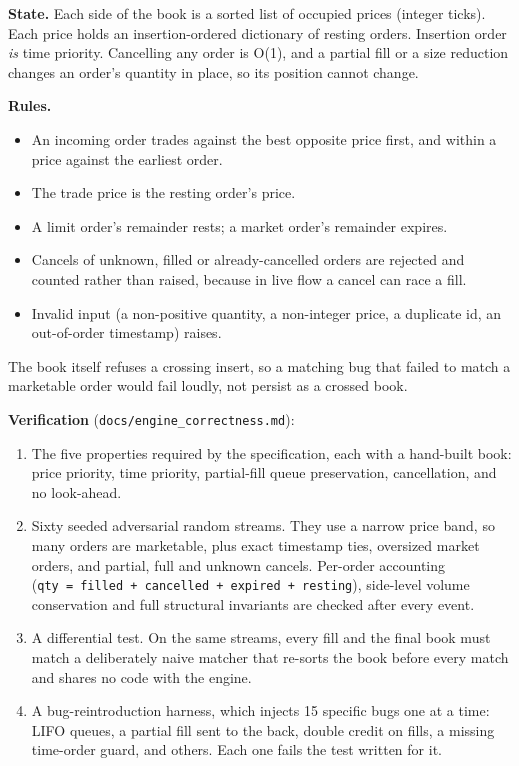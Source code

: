 \documentclass[11pt]{article}
\providecommand{\tightlist}{\setlength{\itemsep}{0pt}\setlength{\parskip}{0pt}}
\begin{document}
\textbf{State.} Each side of the book is a sorted list of occupied prices
(integer ticks). Each price holds an insertion-ordered dictionary of
resting orders. Insertion order \emph{is} time priority. Cancelling any order
is O(1), and a partial fill or a size reduction changes an order's
quantity in place, so its position cannot change.

\textbf{Rules.}

\begin{itemize}
\tightlist
\item
  An incoming order trades against the best opposite price first, and
  within a price against the earliest order.
\item
  The trade price is the resting order's price.
\item
  A limit order's remainder rests; a market order's remainder expires.
\item
  Cancels of unknown, filled or already-cancelled orders are rejected
  and counted rather than raised, because in live flow a cancel can race
  a fill.
\item
  Invalid input (a non-positive quantity, a non-integer price, a
  duplicate id, an out-of-order timestamp) raises.
\end{itemize}

The book itself refuses a crossing insert, so a matching bug that failed
to match a marketable order would fail loudly, not persist as a crossed
book.

\textbf{Verification} (\texttt{docs/engine\_correctness.md}):

\begin{enumerate}
\def\labelenumi{\arabic{enumi}.}
\tightlist
\item
  The five properties required by the specification, each with a
  hand-built book: price priority, time priority, partial-fill queue
  preservation, cancellation, and no look-ahead.
\item
  Sixty seeded adversarial random streams. They use a narrow price
  band, so many orders are marketable, plus exact timestamp ties,
  oversized market orders, and partial, full and unknown cancels.
  Per-order accounting (\texttt{qty\ =\ filled\ +\ cancelled\ +\ expired\ +\ resting}),
  side-level volume conservation and full structural invariants are
  checked after every event.
\item
  A differential test. On the same streams, every fill and the final
  book must match a deliberately naive matcher that re-sorts the book
  before every match and shares no code with the engine.
\item
  A bug-reintroduction harness, which injects 15 specific bugs one at
  a time: LIFO queues, a partial fill sent to the back, double credit
  on fills, a missing time-order guard, and others. Each one fails the
  test written for it.
\end{enumerate}
\end{document}

